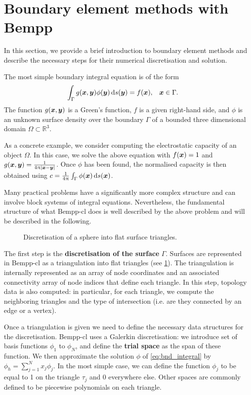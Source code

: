 \section{Boundary element methods with Bempp}
In this section, we provide a brief introduction to boundary element methods and describe the necessary steps for their numerical discretisation and solution.

The most simple boundary integral equation is of the form
\begin{align}
  \label{eq:bnd_integral}
  \int_{\Gamma} g(\bx, \by)\phi(\by)\,\mathrm{d}s(\by) &= f(\bx),&&\bx\in\Gamma.
\end{align}
The function $g(\boldsymbol{x}, \boldsymbol{y})$ is a Green's function, $f$ is a given right-hand side, and $\phi$ is an unknown surface density over the boundary $\Gamma$ of a bounded three dimensional domain $\Omega\subset\mathbb{R}^3$.

As a concrete example, we consider computing the electrostatic capacity of an object $\Omega$. In this case, we solve the above equation with $f(\boldsymbol{x})=1$ and $g(\boldsymbol{x},\boldsymbol{y})=\frac{1}{4\uppi|\boldsymbol{x} - \boldsymbol{y}|}$. Once $\phi$ has been found, the normalised capacity is then obtained using $c = \frac{1}{4\uppi}\int_{\Gamma}\phi(\boldsymbol{x})\,\mathrm{d}s(\boldsymbol{x})$.

Many practical problems have a significantly more complex structure and can involve block systems of integral equations. Nevertheless, the fundamental structure of what Bempp-cl does is well described by the above problem and will be described in the following.

\begin{figure}
  \centering
  
  \caption{Discretisation of a sphere into flat surface triangles.}
  \label{fig:triangulation}
\end{figure}

The first step is the \textbf{discretisation of the surface} $\Gamma$. Surfaces are represented in Bempp-cl as a triangulation into flat triangles (see \cref{fig:triangulation}). The triangulation is internally represented as an array of node coordinates and an associated connectivity array of node indices that define each triangle. In this step, topology data is also computed: in particular, for each triangle, we compute the neighboring triangles and the type of intersection (i.e. are they connected by an edge or a vertex).

Once a triangulation is given we need to define the necessary data structures for the discretisation. Bempp-cl uses a Galerkin discretisation: we introduce set of basis functions \(\phi_1\) to \(\phi_N\), and define the \textbf{trial space} as the span of these function. We then approximate the solution \(\phi\) of \cref{eq:bnd_integral} by $\phi_h=\sum_{j=1}^N x_j\phi_j$. In the most simple case, we can define the function \(\phi_j\) to be equal to 1 on the triangle $\tau_j$ and 0 everywhere else. Other spaces are commonly defined to be piecewise polynomials on each triangle.

